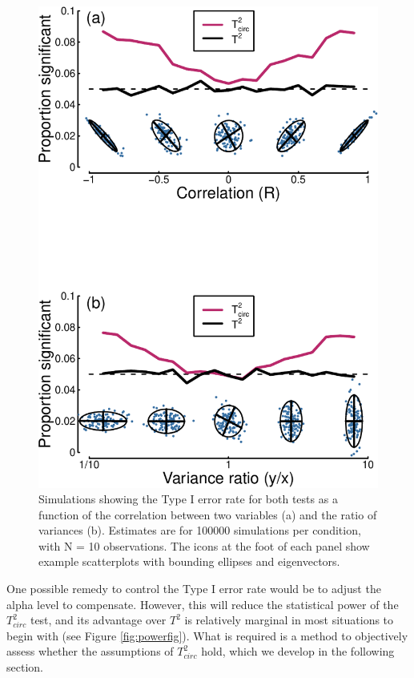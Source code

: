 \documentclass[]{article}
\begin{document}
\begin{figure}
\centering
\includegraphics{manuscript_files/figure-latex/falsealarms-1.pdf}
\caption{\label{fig:falsealarms}Simulations showing the Type I error rate for both tests as a function of the correlation between two variables (a) and the ratio of variances (b). Estimates are for 100000 simulations per condition, with N = 10 observations. The icons at the foot of each panel show example scatterplots with bounding ellipses and eigenvectors.}
\end{figure}

One possible remedy to control the Type I error rate would be to adjust the alpha level to compensate. However, this will reduce the statistical power of the \(T^2_{circ}\) test, and its advantage over \(T^2\) is relatively marginal in most situations to begin with (see Figure \ref{fig:powerfig}). What is required is a method to objectively assess whether the assumptions of \(T^2_{circ}\) hold, which we develop in the following section.
\end{document}
